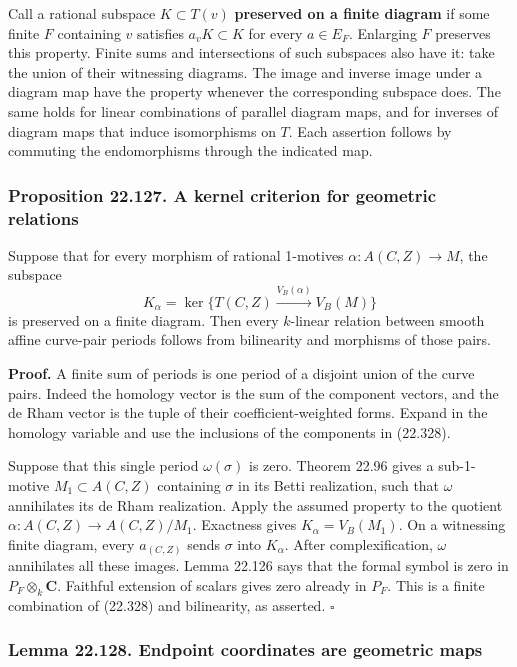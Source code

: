 \documentclass[
  11pt,
  a4paper,
]{article}
\begin{document}
Call a rational subspace \(K\subset T(v)\) \textbf{preserved on a finite
diagram} if some finite \(F\) containing \(v\) satisfies
\(a_vK\subset K\) for every \(a\in E_F\). Enlarging \(F\) preserves this
property. Finite sums and intersections of such subspaces also have it:
take the union of their witnessing diagrams. The image and inverse image
under a diagram map have the property whenever the corresponding
subspace does. The same holds for linear combinations of parallel
diagram maps, and for inverses of diagram maps that induce isomorphisms
on \(T\). Each assertion follows by commuting the endomorphisms through
the indicated map.

\subsubsection{Proposition 22.127. A kernel criterion for geometric
relations}\label{proposition-22.127.-a-kernel-criterion-for-geometric-relations}

Suppose that for every morphism of rational 1-motives
\(\alpha:A(C,Z)\to M\), the subspace \[
 K_\alpha=\ker\{T(C,Z)\xrightarrow{V_B(\alpha)}V_B(M)\}
 \tag{22.330}
\] is preserved on a finite diagram. Then every \(k\)-linear relation
between smooth affine curve-pair periods follows from bilinearity and
morphisms of those pairs.

\textbf{Proof.} A finite sum of periods is one period of a disjoint
union of the curve pairs. Indeed the homology vector is the sum of the
component vectors, and the de Rham vector is the tuple of their
coefficient-weighted forms. Expand in the homology variable and use the
inclusions of the components in (22.328).

Suppose that this single period \(\omega(\sigma)\) is zero. Theorem
22.96 gives a sub-1-motive \(M_1\subset A(C,Z)\) containing \(\sigma\)
in its Betti realization, such that \(\omega\) annihilates its de Rham
realization. Apply the assumed property to the quotient
\(\alpha:A(C,Z)\to A(C,Z)/M_1\). Exactness gives \(K_\alpha=V_B(M_1)\).
On a witnessing finite diagram, every \(a_{(C,Z)}\) sends \(\sigma\)
into \(K_\alpha\). After complexification, \(\omega\) annihilates all
these images. Lemma 22.126 says that the formal symbol is zero in
\(P_F\otimes_k\mathbf C\). Faithful extension of scalars gives zero
already in \(P_F\). This is a finite combination of (22.328) and
bilinearity, as asserted. \(\square\)

\subsubsection{Lemma 22.128. Endpoint coordinates are geometric
maps}\label{lemma-22.128.-endpoint-coordinates-are-geometric-maps}
\end{document}
